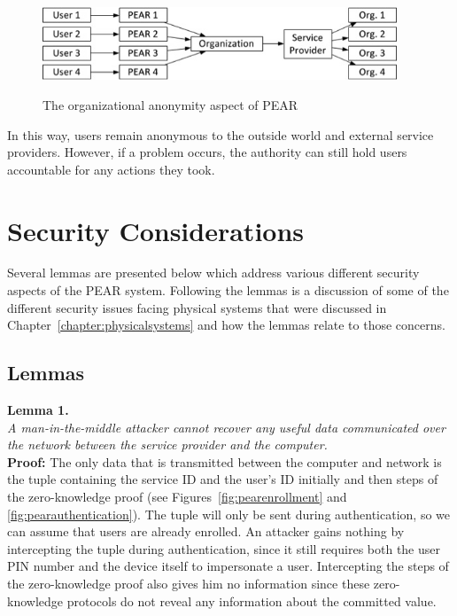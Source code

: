 \begin{figure}[!ht]
\includegraphics[width=400px]{images/pearorgnaizational.jpg}
\label{fig:pearorganizational}
\caption{The organizational anonymity aspect of PEAR}
\end{figure}
\FloatBarrier

In this way, users remain anonymous to the outside world and external service providers. However, if a problem occurs,
the authority can still hold users accountable for any actions they took.

\section{Security Considerations}
Several lemmas are presented below which address various different security aspects of the PEAR system.
Following the lemmas is a discussion of some of the different security issues facing physical systems that
were discussed in Chapter~\ref{chapter:physicalsystems} and how the lemmas relate to those concerns.

\subsection{Lemmas}
\noindent \textbf{Lemma 1.} \\
\noindent \emph{A man-in-the-middle attacker cannot recover any useful data communicated over the network between the
service provider and the computer.} \\
{\bf Proof:}  The only data that is transmitted between the computer and network is the tuple containing the service
ID and the user's ID initially and then steps of the zero-knowledge proof (see Figures~\ref{fig:pearenrollment} and
\ref{fig:pearauthentication}). The tuple will only be sent during authentication, so we can assume that users are already enrolled.
An attacker gains nothing by intercepting the tuple during authentication, since it still requires both the user PIN
number and the device itself to impersonate a user. Intercepting the steps of the zero-knowledge proof also gives him
no information since these zero-knowledge protocols do not reveal any information about the committed value.


